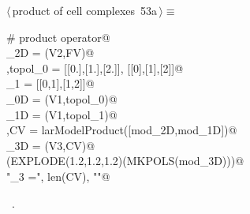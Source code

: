 \documentclass[11pt,oneside]{article}    %
\begin{document}
\begin{flushleft} \small \label{scrap90}
\protect{}$\langle\,$product of cell complexes\nobreak\ {\footnotesize 53a}$\,\rangle\equiv$
\vspace{-1ex}
\begin{list}{}{} \item
\mbox{}\verb@# product operator@\\
\mbox{}\verb@mod_2D = (V2,FV)@\\
\mbox{},topol_0 = [[0.],[1.],[2.]], [[0],[1],[2]]@\\
\mbox{}\verb@topol_1 = [[0,1],[1,2]]@\\
\mbox{}\verb@mod_0D = (V1,topol_0)@\\
\mbox{}\verb@mod_1D = (V1,topol_1)@\\
\mbox{},CV = larModelProduct([mod_2D,mod_1D])@\\
\mbox{}\verb@mod_3D = (V3,CV)@\\
\mbox{}\verb@VIEW(EXPLODE(1.2,1.2,1.2)(MKPOLS(mod_3D)))@\\
\mbox{}\verb@print "\nk_3 =", len(CV), "\n"@\\
\mbox{}\verb@@{\NWsep}
\end{list}
\vspace{-1ex}
\footnotesize\addtolength{\baselineskip}{-1ex}
\begin{list}{}{\setlength{\itemsep}{-\parsep}\setlength{\itemindent}{-\leftmargin}}
\item \NWtxtMacroRefIn\ .
\end{list}
\end{flushleft}
\end{document}
